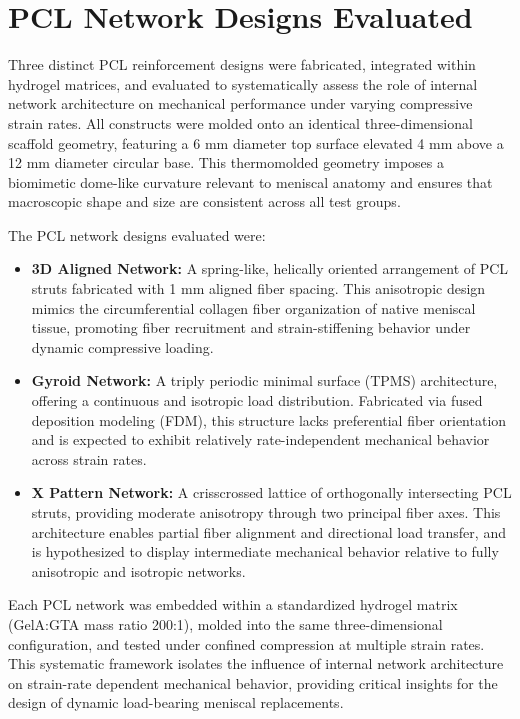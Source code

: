 \section{PCL Network Designs Evaluated}

Three distinct PCL reinforcement designs were fabricated, integrated within hydrogel matrices, and evaluated to systematically assess the role of internal network architecture on mechanical performance under varying compressive strain rates. All constructs were molded onto an identical three-dimensional scaffold geometry, featuring a 6 mm diameter top surface elevated 4 mm above a 12 mm diameter circular base. This thermomolded geometry imposes a biomimetic dome-like curvature relevant to meniscal anatomy and ensures that macroscopic shape and size are consistent across all test groups.

The PCL network designs evaluated were:

\begin{itemize}
    \item \textbf{3D Aligned Network:}  
    A spring-like, helically oriented arrangement of PCL struts fabricated with 1 mm aligned fiber spacing. This anisotropic design mimics the circumferential collagen fiber organization of native meniscal tissue, promoting fiber recruitment and strain-stiffening behavior under dynamic compressive loading.

    \item \textbf{Gyroid Network:}  
    A triply periodic minimal surface (TPMS) architecture, offering a continuous and isotropic load distribution. Fabricated via fused deposition modeling (FDM), this structure lacks preferential fiber orientation and is expected to exhibit relatively rate-independent mechanical behavior across strain rates.

    \item \textbf{X Pattern Network:}  
    A crisscrossed lattice of orthogonally intersecting PCL struts, providing moderate anisotropy through two principal fiber axes. This architecture enables partial fiber alignment and directional load transfer, and is hypothesized to display intermediate mechanical behavior relative to fully anisotropic and isotropic networks.
\end{itemize}

Each PCL network was embedded within a standardized hydrogel matrix (GelA:GTA mass ratio 200:1), molded into the same three-dimensional configuration, and tested under confined compression at multiple strain rates. This systematic framework isolates the influence of internal network architecture on strain-rate dependent mechanical behavior, providing critical insights for the design of dynamic load-bearing meniscal replacements.

